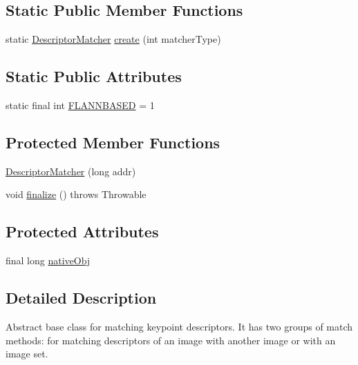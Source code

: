 \subsection*{Static Public Member Functions}
\begin{DoxyCompactItemize}
\item 
static \mbox{\hyperlink{classorg_1_1opencv_1_1features2d_1_1_descriptor_matcher}{Descriptor\+Matcher}} \mbox{\hyperlink{classorg_1_1opencv_1_1features2d_1_1_descriptor_matcher_a14964b877eda32f47ed2d37d22dba3d1}{create}} (int matcher\+Type)
\end{DoxyCompactItemize}
\subsection*{Static Public Attributes}
\begin{DoxyCompactItemize}
\item 
static final int \mbox{\hyperlink{classorg_1_1opencv_1_1features2d_1_1_descriptor_matcher_ab63db8f54105cd9d4712c2fe371fa7b9}{F\+L\+A\+N\+N\+B\+A\+S\+ED}} = 1
\end{DoxyCompactItemize}
\subsection*{Protected Member Functions}
\begin{DoxyCompactItemize}
\item 
\mbox{\hyperlink{classorg_1_1opencv_1_1features2d_1_1_descriptor_matcher_ae55724836cc8b37a853391ff97d24e44}{Descriptor\+Matcher}} (long addr)
\item 
void \mbox{\hyperlink{classorg_1_1opencv_1_1features2d_1_1_descriptor_matcher_ad785f08a619cbbaf5dcb926fdc12aef6}{finalize}} ()  throws Throwable 
\end{DoxyCompactItemize}
\subsection*{Protected Attributes}
\begin{DoxyCompactItemize}
\item 
final long \mbox{\hyperlink{classorg_1_1opencv_1_1features2d_1_1_descriptor_matcher_a9e8464485925fc0504cfefec24d4b299}{native\+Obj}}
\end{DoxyCompactItemize}


\subsection{Detailed Description}
Abstract base class for matching keypoint descriptors. It has two groups of match methods\+: for matching descriptors of an image with another image or with an image set.


